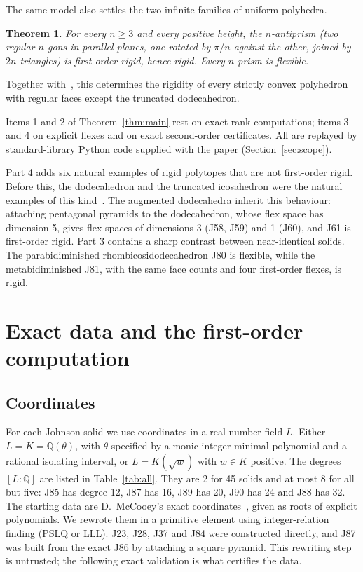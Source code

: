 \documentclass[11pt]{amsart}
\newtheorem{theorem}{Theorem}[section]
\theoremstyle{remark}
\newcommand{\Q}{\mathbb Q}
\begin{document}
The same model also settles the two infinite families of uniform polyhedra.

\begin{theorem}\label{thm:anti}
For every $n\ge3$ and every positive height, the $n$-antiprism (two regular $n$-gons in parallel planes, one rotated by $\pi/n$ against the other, joined by $2n$ triangles) is first-order rigid, hence rigid. Every $n$-prism is flexible.
\end{theorem}

Together with~\cite{AHWZ2026}, this determines the rigidity of every strictly convex polyhedron with regular faces except the truncated dodecahedron.

Items 1 and 2 of Theorem~\ref{thm:main} rest on exact rank computations; items 3 and 4 on explicit flexes and on exact second-order certificates. All are replayed by standard-library Python code supplied with the paper (Section~\ref{sec:scope}).

Part 4 adds six natural examples of rigid polytopes that are not first-order rigid. Before this, the dodecahedron and the truncated icosahedron were the natural examples of this kind~\cite[Sec.~8]{AHWZ2026}. The augmented dodecahedra inherit this behaviour: attaching pentagonal pyramids to the dodecahedron, whose flex space has dimension 5, gives flex spaces of dimensions 3 (J58, J59) and 1 (J60), and J61 is first-order rigid. Part 3 contains a sharp contrast between near-identical solids. The parabidiminished rhombicosidodecahedron J80 is flexible, while the metabidiminished J81, with the same face counts and four first-order flexes, is rigid.

\section{Exact data and the first-order computation}\label{sec:data}

\subsection{Coordinates}
For each Johnson solid we use coordinates in a real number field $L$. Either $L=K=\Q(\theta)$, with $\theta$ specified by a monic integer minimal polynomial and a rational isolating interval, or $L=K(\sqrt w)$ with $w\in K$ positive. The degrees $[L:\Q]$ are listed in Table~\ref{tab:all}. They are 2 for 45 solids and at most 8 for all but five: J85 has degree 12, J87 has 16, J89 has 20, J90 has 24 and J88 has 32. The starting data are D.~McCooey's exact coordinates~\cite{McCooey}, given as roots of explicit polynomials. We rewrote them in a primitive element using integer-relation finding (PSLQ or LLL). J23, J28, J37 and J84 were constructed directly, and J87 was built from the exact J86 by attaching a square pyramid. This rewriting step is untrusted; the following exact validation is what certifies the data.
\end{document}
